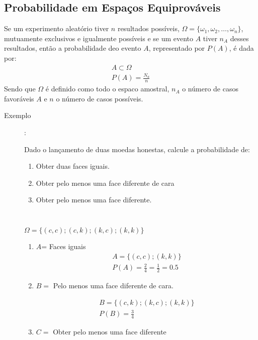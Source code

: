 \documentclass[11pt,a4paper]{book}
\begin{document}
\begin{description}
\subsection{Probabilidade em Espaços Equiprováveis}
Se um experimento aleatório tiver $n$ resultados possíveis, $\Omega = \{ \omega_1,\omega_2,\ldots,\omega_n \}$, mutuamente exclusivos e igualmente possíveis e se um evento $A$ tiver $n_A$ desses resultados, então a probabilidade deo evento $A$, representado por $P(A)$, é dada por: 
\begin{align}
  A \subset \Omega \nonumber\\
  P(A)= \frac{N_a}{n} 
\end{align}
Sendo que $\Omega$ é definido como todo o espaco amostral, $n_A$ o número de casos favoráveis $A$ e $n$ o número de casos possíveis.

\begin{description}
\item [Exemplo]: 

Dado o lançamento de duas moedas honestas, calcule a probabilidade de: 
\begin{enumerate}[label=(\alph*)]
  \item  Obter duas faces iguais.
  \item Obter pelo menos uma face diferente de cara
  \item  Obter pelo menos uma face diferente.
\end{enumerate}

\begin{table}[]
  \centering
  \caption{}
  \label{}
  \begin{tabular}{}

  \end{tabular}
\end{table}
$\Omega = \{ (c,c); (c,k); (k,c) ; (k,k)\}$

\begin{enumerate}[label=(\alph*)]
  \item $A$= Faces iguais
    \begin{align*}
      A= \{ (c,c) ; (k,k) \} \\
      P(A) = \frac{2}{4} = \frac{1}{2}= 0.5
    \end{align*}
  \item $B=$ Pelo menos uma face diferente de cara.

    \begin{align*}
      B= \{ (c,k); (k,c); (k,k) \}\\
      P(B)= \frac{3}{4}
    \end{align*}
  \item  $C=$ Obter pelo menos uma face diferente


\end{enumerate}
\end{description}
\end{description}
\end{document}
